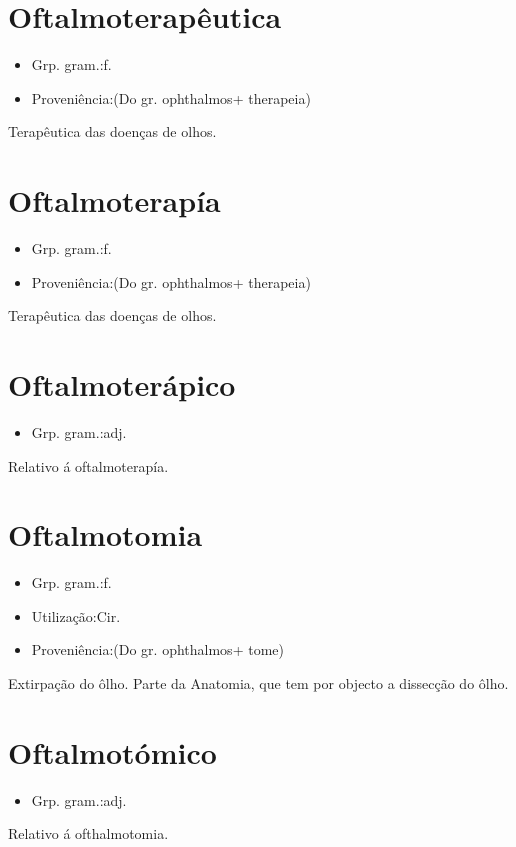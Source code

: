 \section{Oftalmoterapêutica}
\begin{itemize}
\item {Grp. gram.:f.}
\end{itemize}
\begin{itemize}
\item {Proveniência:(Do gr. \textunderscore ophthalmos\textunderscore  + \textunderscore therapeia\textunderscore )}
\end{itemize}
Terapêutica das doenças de olhos.
\section{Oftalmoterapía}
\begin{itemize}
\item {Grp. gram.:f.}
\end{itemize}
\begin{itemize}
\item {Proveniência:(Do gr. \textunderscore ophthalmos\textunderscore  + \textunderscore therapeia\textunderscore )}
\end{itemize}
Terapêutica das doenças de olhos.
\section{Oftalmoterápico}
\begin{itemize}
\item {Grp. gram.:adj.}
\end{itemize}
Relativo á oftalmoterapía.
\section{Oftalmotomia}
\begin{itemize}
\item {Grp. gram.:f.}
\end{itemize}
\begin{itemize}
\item {Utilização:Cir.}
\end{itemize}
\begin{itemize}
\item {Proveniência:(Do gr. \textunderscore ophthalmos\textunderscore  + \textunderscore tome\textunderscore )}
\end{itemize}
Extirpação do ôlho.
Parte da Anatomia, que tem por objecto a dissecção do ôlho.
\section{Oftalmotómico}
\begin{itemize}
\item {Grp. gram.:adj.}
\end{itemize}
Relativo á ofthalmotomia.
